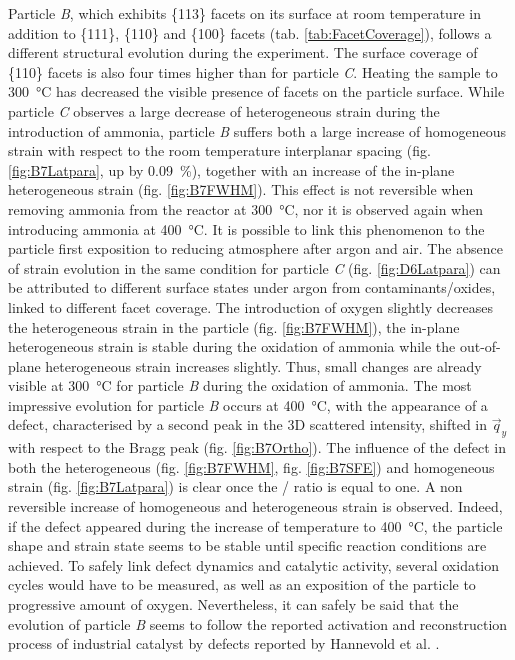 Particle \textit{B}, which exhibits \{113\} facets on its surface at room temperature in addition to \{111\}, \{110\} and \{100\} facets (tab. \ref{tab:FacetCoverage}), follows a different structural evolution during the experiment.
The surface coverage of \{110\} facets is also four times higher than for particle \textit{C}.
Heating the sample to \qty{300}{\degreeCelsius} has decreased the visible presence of facets on the particle surface.
While particle \textit{C} observes a large decrease of heterogeneous strain during the introduction of ammonia, particle \textit{B} suffers both a large increase of homogeneous strain with respect to the room temperature interplanar spacing (fig. \ref{fig:B7Latpara}, up by \qty{0.09}{\percent}), together with an increase of the in-plane heterogeneous strain (fig. \ref{fig:B7FWHM}).
This effect is not reversible when removing ammonia from the reactor at \qty{300}{\degreeCelsius}, nor it is observed again when introducing ammonia at \qty{400}{\degreeCelsius}.
It is possible to link this phenomenon to the particle first exposition to reducing atmosphere after argon and air.
The absence of strain evolution in the same condition for particle \textit{C} (fig. \ref{fig:D6Latpara}) can be attributed to different surface states under argon from contaminants/oxides, linked to different facet coverage.
The introduction of oxygen slightly decreases the heterogeneous strain in the particle (fig. \ref{fig:B7FWHM}), the in-plane heterogeneous strain is stable during the oxidation of ammonia while the out-of-plane heterogeneous strain increases slightly.
Thus, small changes are already visible at \qty{300}{\degreeCelsius} for particle \textit{B} during the oxidation of ammonia.
The most impressive evolution for particle \textit{B} occurs at \qty{400}{\degreeCelsius}, with the appearance of a defect, characterised by a second peak in the 3D scattered intensity, shifted in $\vec{q}_y$ with respect to the Bragg peak (fig. \ref{fig:B7Ortho}).
The influence of the defect in both the heterogeneous (fig. \ref{fig:B7FWHM}, fig. \ref{fig:B7SFE}) and homogeneous strain (fig. \ref{fig:B7Latpara}) is clear once the / ratio is equal to one.
A non reversible increase of homogeneous and heterogeneous strain is observed.
Indeed, if the defect appeared during the increase of temperature to \qty{400}{\degreeCelsius}, the particle shape and strain state seems to be stable until specific reaction conditions are achieved.
To safely link defect dynamics and catalytic activity, several oxidation cycles would have to be measured, as well as an exposition of the particle to progressive amount of oxygen.
Nevertheless, it can safely be said that the evolution of particle \textit{B} seems to follow the reported activation and reconstruction process of industrial catalyst by defects reported by Hannevold et al. \parencite*{Hannevold2005}.

